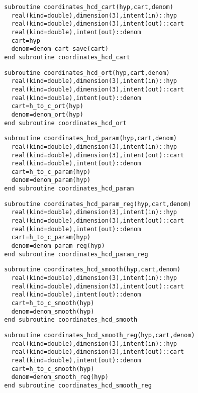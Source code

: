 \begin{Verbatim}
  subroutine coordinates_hcd_cart(hyp,cart,denom)
    real(kind=double),dimension(3),intent(in)::hyp
    real(kind=double),dimension(3),intent(out)::cart
    real(kind=double),intent(out)::denom
    cart=hyp
    denom=denom_cart_save(cart)
  end subroutine coordinates_hcd_cart
\end{Verbatim}

\begin{Verbatim}
  subroutine coordinates_hcd_ort(hyp,cart,denom)
    real(kind=double),dimension(3),intent(in)::hyp
    real(kind=double),dimension(3),intent(out)::cart
    real(kind=double),intent(out)::denom
    cart=h_to_c_ort(hyp)
    denom=denom_ort(hyp)
  end subroutine coordinates_hcd_ort
\end{Verbatim}

\begin{Verbatim}
  subroutine coordinates_hcd_param(hyp,cart,denom)
    real(kind=double),dimension(3),intent(in)::hyp
    real(kind=double),dimension(3),intent(out)::cart
    real(kind=double),intent(out)::denom
    cart=h_to_c_param(hyp)
    denom=denom_param(hyp)
  end subroutine coordinates_hcd_param
\end{Verbatim}

\begin{Verbatim}
  subroutine coordinates_hcd_param_reg(hyp,cart,denom)
    real(kind=double),dimension(3),intent(in)::hyp
    real(kind=double),dimension(3),intent(out)::cart
    real(kind=double),intent(out)::denom
    cart=h_to_c_param(hyp)
    denom=denom_param_reg(hyp)
  end subroutine coordinates_hcd_param_reg
\end{Verbatim}

\begin{Verbatim}
  subroutine coordinates_hcd_smooth(hyp,cart,denom)
    real(kind=double),dimension(3),intent(in)::hyp
    real(kind=double),dimension(3),intent(out)::cart
    real(kind=double),intent(out)::denom
    cart=h_to_c_smooth(hyp)
    denom=denom_smooth(hyp)
  end subroutine coordinates_hcd_smooth
\end{Verbatim}
  
\begin{Verbatim}
  subroutine coordinates_hcd_smooth_reg(hyp,cart,denom)
    real(kind=double),dimension(3),intent(in)::hyp
    real(kind=double),dimension(3),intent(out)::cart
    real(kind=double),intent(out)::denom
    cart=h_to_c_smooth(hyp)
    denom=denom_smooth_reg(hyp)
  end subroutine coordinates_hcd_smooth_reg
\end{Verbatim}
  
